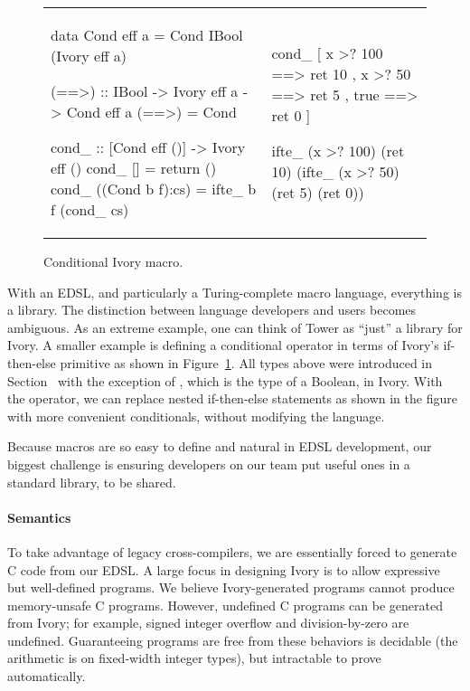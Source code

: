 \begin{figure}
  \begin{tabular}{p{}|p{}}
    \begin{smcode}
data Cond eff a =
  Cond IBool (Ivory eff a)

(==>) :: IBool -> Ivory eff a
      -> Cond eff a
(==>) = Cond

cond_ :: [Cond eff ()]
      -> Ivory eff ()
cond_ [] = return ()
cond_ ((Cond b f):cs) =
  ifte_ b f (cond_ cs)
    \end{smcode} &
    \begin{smcode}
cond_
  [ x >? 100 ==> ret 10
  , x >? 50  ==> ret 5
  , true     ==> ret 0 ]

ifte_ (x >? 100)
 (ret 10)
 (ifte_ (x >? 50)
   (ret 5)
     (ret 0))
    \end{smcode}
  \end{tabular}
  \caption{Conditional Ivory macro.}
  \label{fig:ivory-cond}
\end{figure}

With an EDSL, and particularly a Turing-complete macro language, everything is a
library.  The distinction between language developers and users becomes
ambiguous.  As an extreme example, one can think of Tower as ``just'' a library
for Ivory.  A smaller example is defining a conditional operator in terms of
Ivory's if-then-else primitive as shown in Figure~\ref{fig:ivory-cond}.  All
types above were introduced in Section~\cite{sec:ivory} with the exception of
, which is the type of a Boolean, in Ivory.  With the 
operator, we can replace nested if-then-else statements as shown in the figure
with more convenient conditionals, without modifying the language.

Because macros are so easy to define and natural in EDSL development, our
biggest challenge is ensuring developers on our team put useful ones in a
standard library, to be shared.


\paragraph{Semantics}
To take advantage of legacy cross-compilers, we are essentially forced to
generate C code from our EDSL.  A large focus in designing Ivory is to allow
expressive but well-defined programs.  We believe Ivory-generated programs
cannot produce memory-unsafe C programs.  However, undefined C programs can be
generated from Ivory; for example, signed integer overflow and division-by-zero
are undefined.  Guaranteeing programs are free from these behaviors is decidable
(the arithmetic is on fixed-width integer types), but intractable to prove
automatically.

